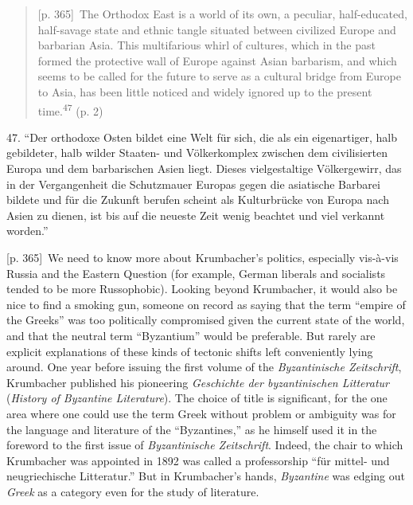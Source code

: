 \documentclass[10pt,a4paper]{article}
\begin{document}
\begin{quote}{\scriptsize\color{gray}[p. 365]}\ The Orthodox East is a world of its own, a peculiar, half-educated, half-savage state and ethnic tangle situated between civilized Europe and barbarian Asia. This multifarious whirl of cultures, which in the past formed the protective wall of Europe against Asian barbarism, and which seems to be called for the future to serve as a cultural bridge from Europe to Asia, has been little noticed and widely ignored up to the present time.\nobreak\textsuperscript{47} (p. 2)\par\end{quote}{\small 47. “Der orthodoxe Osten bildet eine Welt für sich, die als ein eigenartiger, halb gebildeter, halb wilder Staaten- und Völkerkomplex zwischen dem civilisierten Europa und dem barbarischen Asien liegt. Dieses vielgestaltige Völkergewirr, das in der Vergangenheit die Schutzmauer Europas gegen die asiatische Barbarei bildete und für die Zukunft berufen scheint als Kulturbrücke von Europa nach Asien zu dienen, ist bis auf die neueste Zeit wenig beachtet und viel verkannt worden.”\par}
{\scriptsize\color{gray}[p. 365]}\ We need to know more about Krumbacher’s politics, especially vis-à-vis Russia and the Eastern Question (for example, German liberals and socialists tended to be more Russophobic). Looking beyond Krumbacher, it would also be nice to find a smoking gun, someone on record as saying that the term “empire of the Greeks” was too politically compromised given the current state of the world, and that the neutral term “Byzantium” would be preferable. But rarely are explicit explanations of these kinds of tectonic shifts left conveniently lying around. One year before issuing the first volume of the \textit{Byzantinische Zeitschrift}, Krumbacher published his pioneering \textit{Geschichte der byzantinischen Litteratur} (\textit{History of Byzantine Literature}). The choice of title is significant, for the one area where one could use the term Greek without problem or ambiguity was for the language and literature of the “Byzantines,” as he himself used it in the foreword to the first issue of \textit{Byzantinische Zeitschrift}. Indeed, the chair to which Krumbacher was appointed in 1892 was called a professorship “für mittel- und neugriechische Litteratur.” But in Krumbacher’s hands, \textit{Byzantine} was edging out \textit{Greek} as a category even for the study of literature.\par
\end{document}
